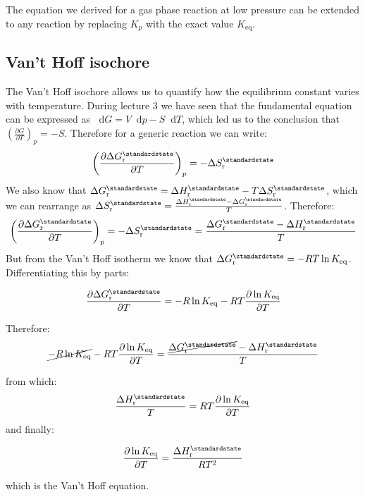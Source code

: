 \documentclass[12pt,a4paper]{report}
\newcommand*\diff{\mathop{}\!\mathrm{d}}
\newif\ifstudents
\begin{document}
   The equation we derived for a gas phase reaction at low pressure can be extended to any reaction by replacing $K_{p}$ with the exact value $K_{\mathrm{eq}}$.
   \subsection*{Van't Hoff isochore}
   The Van't Hoff isochore allows us to quantify how the equilibrium constant varies with temperature.
   During lecture 3 we have seen that the fundamental equation can be expressed as $\diff G = V\diff p-S\diff T$, which led us to the conclusion that $\left(\frac{\partial G}{\partial T}\right)_{p}=-S$. Therefore for a generic reaction we can write:
   \begin{equation*}
   \left(\frac{\partial \Delta G^{\standardstate}_{\mathrm{r}}}{\partial T}\right)_{p}=-\Delta S^{\standardstate}_{\mathrm{r}}
   \end{equation*}
   We also know that $\Delta G^{\standardstate}_{\mathrm{r}} = \Delta H^{\standardstate}_{\mathrm{r}}-T\Delta S^{\standardstate}_{\mathrm{r}}$, which we can rearrange as $\Delta S^{\standardstate}_{\mathrm{r}} = \frac{\Delta H^{\standardstate}_{\mathrm{r}}-\Delta G^{\standardstate}_{\mathrm{r}}}{T}$.
   Therefore:
   \begin{equation*}
   \left(\frac{\partial \Delta G^{\standardstate}_{\mathrm{r}}}{\partial T}\right)_{p}=-\Delta S^{\standardstate}_{\mathrm{r}} = \frac{\Delta G^{\standardstate}_{\mathrm{r}}-\Delta H^{\standardstate}_{\mathrm{r}}}{T}
   \end{equation*}
   But from the Van't Hoff isotherm we know that $\Delta G^{\standardstate}_{\mathrm{r}} =-RT \ln K_{\mathrm{eq}}$. Differentiating this by parts:
   \ifstudents \hideit[2]{ \fi
   \begin{equation*}
   \frac{\partial\Delta G^{\standardstate}_{\mathrm{r}}}{\partial T}=-R\ln K_{\mathrm{eq}}-RT \frac{\partial \ln K_{\mathrm{eq}}}{\partial T}
   \end{equation*}
   
   Therefore:
   \begin{equation*}
  \cancel{-R\ln K_{\mathrm{eq}}}-RT \frac{\partial \ln K_{\mathrm{eq}}}{\partial T}=\frac{\cancel{\Delta G^{\standardstate}_{\mathrm{r}}}-\Delta H^{\standardstate}_{\mathrm{r}}}{T}
   \end{equation*}
   \ifstudents } \fi
   from which:
   \begin{equation*}
   \frac{\Delta H^{\standardstate}_{\mathrm{r}}}{T}=RT \frac{\partial \ln K_{\mathrm{eq}}}{\partial T}
   \end{equation*}   
   and finally:
   \ifstudents \hideit[2]{ \fi
   \begin{equation*}
   \frac{\partial \ln K_{\mathrm{eq}}}{\partial T} = \frac{\Delta H^{\standardstate}_{\mathrm{r}}}{RT^{2}}
   \end{equation*} 
   \ifstudents } \fi
   which is the Van't Hoff equation.
  
\end{document}
